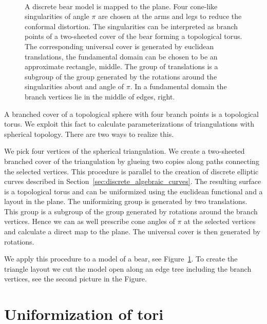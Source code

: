 \documentclass[Thesis.tex]{subfiles}
\begin{document}
\begin{figure}
\centering
{}\\
\caption{
A discrete bear model is mapped to the plane.
Four cone-like singularities of angle $\pi$ are chosen at the arms and legs to reduce the conformal distortion.
The singularities can be interpreted as branch points of a two-sheeted cover of the bear forming a topological torus.
The corresponding universal cover is generated by euclidean translations, the fundamental domain can be chosen to be an approximate rectangle, middle.
The group of translations is a subgroup of the group generated by the rotations around the singularities about and angle of $\pi$. In a fundamental domain the branch vertices lie in the middle of edges, right.
}
\label{fig:bear}
\end{figure}

A branched cover of a topological sphere with four branch points is a topological torus.
We exploit this fact to calculate parameterizations of triangulations with spherical topology.
There are two ways to realize this.

We pick four vertices of the spherical triangulation. We create a two-sheeted branched cover of the triangulation by glueing two copies along paths connecting the selected vertices.
This procedure is parallel to the creation of discrete elliptic curves described in Section~\ref{sec:discrete_algebraic_curves}.
The resulting surface is a topological torus and can be uniformized using the euclidean functional and a layout in the plane.
The uniformizing group is generated by two translations.
This group is a subgroup of the group generated by rotations around the branch vertices.
Hence we can as well prescribe cone angles of $\pi$ at the selected vertices and calculate a direct map to the plane.
The universal cover is then generated by rotations.

We apply this procedure to a model of a bear, see Figure~\ref{fig:bear}. To create the triangle layout we cut the model open along an edge tree including the branch vertices, see the second picture in the Figure.

\section{Uniformization of tori}
\label{sec:tori}
\end{document}
